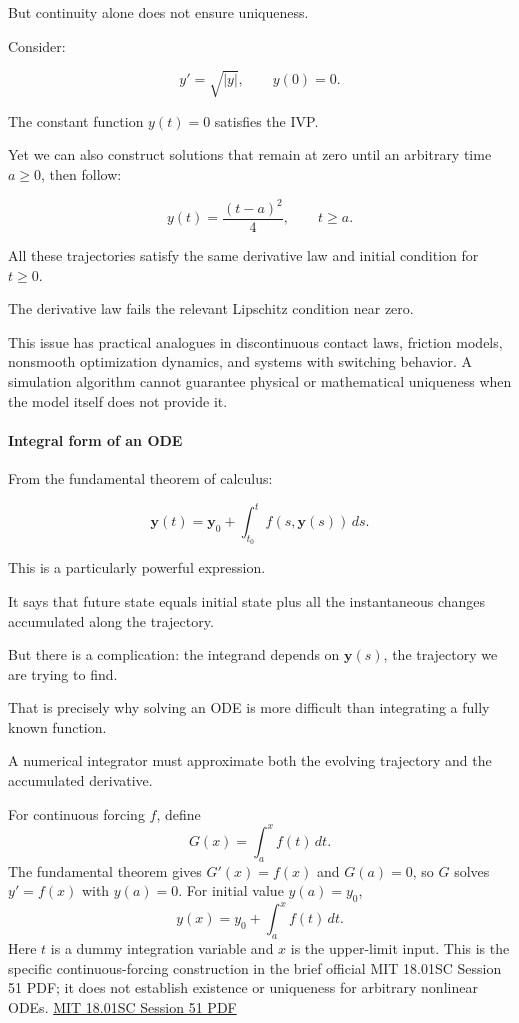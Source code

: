 But continuity alone does not ensure uniqueness.

Consider:

\[
y'=\sqrt{|y|}, \qquad y(0)=0.
\]

The constant function \(y(t)=0\) satisfies the IVP.

Yet we can also construct solutions that remain at zero until an arbitrary time \(a\ge0\), then follow:

\[
y(t)=\frac{(t-a)^2}{4}, \qquad t\ge a.
\]

All these trajectories satisfy the same derivative law and initial condition for \(t\ge0\).

The derivative law fails the relevant Lipschitz condition near zero.

This issue has practical analogues in discontinuous contact laws, friction models, nonsmooth optimization dynamics, and systems with switching behavior. A simulation algorithm cannot guarantee physical or mathematical uniqueness when the model itself does not provide it.

\paragraph{Integral form of an ODE}\label{02-foundations-ii-ch022-integral-form-of-an-ode}

\hypertarget{02-foundations-ii-ch022-integral-form-of-an-ode}{}

From the fundamental theorem of calculus:

\[
\boxed{ \mathbf y(t) = \mathbf y_0+ \int_{t_0}^{t}f(s,\mathbf y(s))\,ds }.
\]

This is a particularly powerful expression.

It says that future state equals initial state plus all the instantaneous changes accumulated along the trajectory.

But there is a complication: the integrand depends on \(\mathbf y(s)\), the trajectory we are trying to find.

That is precisely why solving an ODE is more difficult than integrating a fully known function.

A numerical integrator must approximate both the evolving trajectory and the accumulated derivative.

For continuous forcing \(f\), define \[
G(x)=\int_a^x f(t)\,dt.
\] The fundamental theorem gives \(G'(x)=f(x)\) and \(G(a)=0\), so \(G\) solves \(y'=f(x)\) with \(y(a)=0\). For initial value \(y(a)=y_0\), \[
y(x)=y_0+\int_a^x f(t)\,dt.
\] Here \(t\) is a dummy integration variable and \(x\) is the upper-limit input. This is the specific continuous-forcing construction in the brief official MIT 18.01SC Session 51 PDF; it does not establish existence or uniqueness for arbitrary nonlinear ODEs. \href{https://ocw.mit.edu/courses/18-01sc-single-variable-calculus-fall-2010/2459faee7ec3308afd5cca2b95fad48e_MIT18_01SCF10_Ses51a.pdf}{MIT 18.01SC Session 51 PDF}

